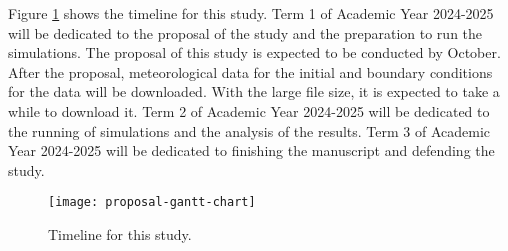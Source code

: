 	Figure \ref{fig:timeline} shows the timeline for this study.
	Term 1 of Academic Year 2024-2025 will be dedicated to the proposal of the study and the preparation to run the simulations.
	The proposal of this study is expected to be conducted by October.
	After the proposal, meteorological data for the initial and boundary conditions for the data will be downloaded.
	With the large file size, it is expected to take a while to download it.
	Term 2 of Academic Year 2024-2025 will be dedicated to the running of simulations and the analysis of the results.
	Term 3 of Academic Year 2024-2025 will be dedicated to finishing the manuscript and defending the study.
	
	\begin{figure}
		\centering
		\texttt{[image: proposal-gantt-chart]}
		\caption{Timeline for this study.}
		\label{fig:timeline}
	\end{figure}